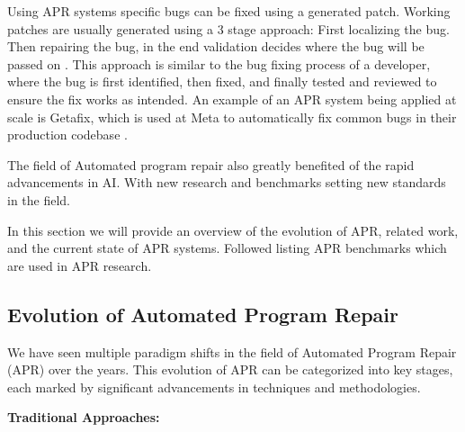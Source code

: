 Using APR systems specific bugs can be fixed using a generated patch. Working patches are usually generated using a 3 stage approach: First localizing the bug. Then repairing the bug, in the end validation decides where the bug will be passed on \cite{zhangSurveyLearningbasedAutomated2024, baderGetafixLearningFix2019}. This approach is similar to the bug fixing process of a developer, where the bug is first identified, then fixed, and finally tested and reviewed to ensure the fix works as intended. An example of an APR system being applied at scale is Getafix, which is used at Meta to automatically fix common bugs in their production codebase \cite{baderGetafixLearningFix2019}.

The field of Automated program repair also greatly benefited of the rapid advancements in AI. With new research and benchmarks setting new standards in the field.\cite{puvvadiCodingAgentsComprehensive2025,houLargeLanguageModels2024}

In this section we will provide an overview of the evolution of APR, related work, and the current state of APR systems. Followed listing APR benchmarks which are used in APR research.

\subsection{Evolution of Automated Program Repair} \label{subsection:evolution-apr}

We have seen multiple paradigm shifts in the field of Automated Program Repair (APR) over the years. This evolution of APR can be categorized into key stages, each marked by significant advancements in techniques and methodologies.

\textbf{Traditional Approaches:}

